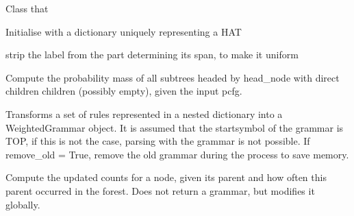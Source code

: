 \documentclass[letterpaper,10pt,english]{sphinxmanual}
\begin{document}
\begin{fulllineitems}
\label{process_hats:process_hats.HATGrammar}
Class that

Initialise with a dictionary uniquely representing a HAT

\begin{fulllineitems}
\label{process_hats:process_hats.HATGrammar.plain_label}
strip the label from the part determining
its span, to make it uniform

\end{fulllineitems}


\begin{fulllineitems}
\label{process_hats:process_hats.HATGrammar.probmass}
Compute the probability mass of all subtrees headed by head\_node with
direct children children (possibly empty), given the input pcfg.

\end{fulllineitems}


\begin{fulllineitems}
\label{process_hats:process_hats.HATGrammar.to_WeightedGrammar}
Transforms a set of rules represented in a
nested dictionary into a WeightedGrammar object.
It is assumed that the startsymbol of the grammar is 
TOP, if this is not the case, parsing with the grammar
is not possible.
If remove\_old = True, remove the old grammar during the
process to save memory.

\end{fulllineitems}


\begin{fulllineitems}
\label{process_hats:process_hats.HATGrammar.update}
Compute the updated counts for a node, given its parent
and how often this parent occurred in the forest.
Does not return a grammar, but modifies it globally.


\end{fulllineitems}
\end{fulllineitems}
\end{document}
